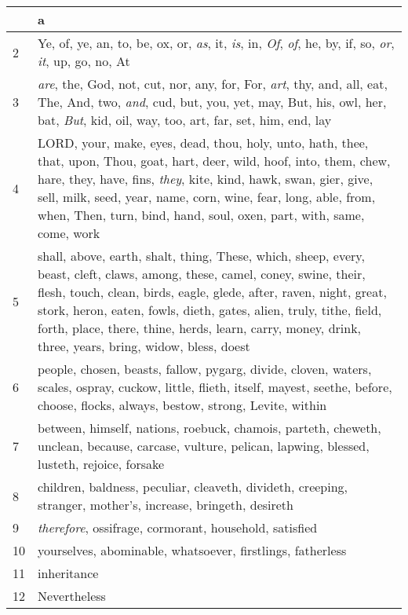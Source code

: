 \begin{longtable}{l|p{3.75in}}
\hline \hline
\endlastfoot
1 & a \\ \hline
2 & Ye, of, ye, an, to, be, ox, or, \emph{as}, it, \emph{is}, in, \emph{Of}, \emph{of}, he, by, if, so, \emph{or}, \emph{it}, up, go, no, At \\ \hline
3 & \emph{are}, the, God, not, cut, nor, any, for, For, \emph{art}, thy, and, all, eat, The, And, two, \emph{and}, cud, but, you, yet, may, But, his, owl, her, bat, \emph{But}, kid, oil, way, too, art, far, set, him, end, lay \\ \hline
4 & LORD, your, make, eyes, dead, thou, holy, unto, hath, thee, that, upon, Thou, goat, hart, deer, wild, hoof, into, them, chew, hare, they, have, fins, \emph{they}, kite, kind, hawk, swan, gier, give, sell, milk, seed, year, name, corn, wine, fear, long, able, from, when, Then, turn, bind, hand, soul, oxen, part, with, same, come, work \\ \hline
5 & shall, above, earth, shalt, thing, These, which, sheep, every, beast, cleft, claws, among, these, camel, coney, swine, their, flesh, touch, clean, birds, eagle, glede, after, raven, night, great, stork, heron, eaten, fowls, dieth, gates, alien, truly, tithe, field, forth, place, there, thine, herds, learn, carry, money, drink, three, years, bring, widow, bless, doest \\ \hline
6 & people, chosen, beasts, fallow, pygarg, divide, cloven, waters, scales, ospray, cuckow, little, flieth, itself, mayest, seethe, before, choose, flocks, always, bestow, strong, Levite, within \\ \hline
7 & between, himself, nations, roebuck, chamois, parteth, cheweth, unclean, because, carcase, vulture, pelican, lapwing, blessed, lusteth, rejoice, forsake \\ \hline
8 & children, baldness, peculiar, cleaveth, divideth, creeping, stranger, mother's, increase, bringeth, desireth \\ \hline
9 & \emph{therefore}, ossifrage, cormorant, household, satisfied \\ \hline
10 & yourselves, abominable, whatsoever, firstlings, fatherless \\ \hline
11 & inheritance \\ \hline
12 & Nevertheless \\ \hline
\end{longtable}






 



